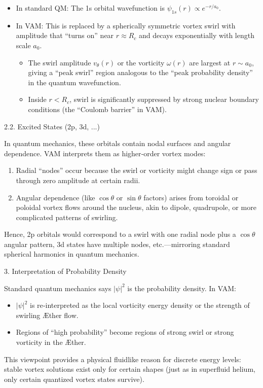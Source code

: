 \begin{itemize}
    \item In standard QM: The 1s orbital wavefunction is \(\psi_{1s}(r) \propto e^{-r/a_0}\).
    \item In VAM: This is replaced by a spherically symmetric vortex swirl with amplitude that “turns on” near \(r \approx R_c\) and decays exponentially with length scale \(a_0\).
        \begin{itemize}
        \item The swirl amplitude \(v_\theta(r)\) or the vorticity \(\omega(r)\) are largest at \(r \sim a_0\), giving a “peak swirl” region analogous to the “peak probability density” in the quantum wavefunction.
        \item Inside \(r < R_c\), swirl is significantly suppressed by strong nuclear boundary conditions (the “Coulomb barrier” in VAM).
        \end{itemize}
\end{itemize}




2.2. Excited States (2p, 3d, ...)

In quantum mechanics, these orbitals contain nodal surfaces and angular dependence. VAM interprets them as higher‐order vortex modes:

\begin{enumerate}
\item Radial “nodes” occur because the swirl or vorticity might change sign or pass through zero amplitude at certain radii.
\item Angular dependence (like \(\cos\theta\) or \(\sin\theta\) factors) arises from toroidal or poloidal vortex flows around the nucleus, akin to dipole, quadrupole, or more complicated patterns of swirling.
\end{enumerate}
Hence, 2p orbitals would correspond to a swirl with one radial node plus a \(\cos\theta\) angular pattern, 3d states have multiple nodes, etc.—mirroring standard spherical harmonics in quantum mechanics.


3. Interpretation of Probability Density

Standard quantum mechanics says \(|\psi|^2\) is the probability density. In VAM:

\begin{itemize}
\item \(|\psi|^2\) is re‐interpreted as the local vorticity energy density or the strength of swirling Æther flow.
\item Regions of “high probability” become regions of strong swirl or strong vorticity in the Æther.
\end{itemize}
This viewpoint provides a physical fluidlike reason for discrete energy levels: stable vortex solutions exist only for certain shapes (just as in superfluid helium, only certain quantized vortex states survive).

